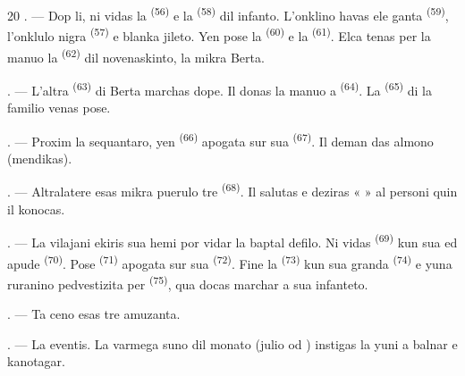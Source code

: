 \begin{VUpage}[22]{20}
. --- Dop li, ni vidas la  \textsuperscript{(56)} e la\nl
{} \textsuperscript{(58)} dil infanto. L'onklino havas ele\cc
ganta  \textsuperscript{(59)}, l'onklulo nigra  \textsuperscript{(57)}\nl
e blanka jileto. Yen pose la  \textsuperscript{(60)} e la\nl
{} \textsuperscript{(61)}. Elca tenas per la manuo la \cc
{} \textsuperscript{(62)} dil novenaskinto, la mikra Berta.

. --- L'altra  \textsuperscript{(63)} di Berta marchas\nl
dope. Il donas la manuo a  \textsuperscript{(64)}. La\nl
{} \textsuperscript{(65)} di la familio venas pose.

\VUsaut{4.6mm}
\VUsaut{3.4mm}

. --- Proxim la sequantaro, yen \cc
{} \textsuperscript{(66)} apogata sur sua  \textsuperscript{(67)}. Il deman\cc
das almono (mendikas).

. --- Altralatere esas mikra puerulo tre\nl
{} \textsuperscript{(68)}. Il salutas e deziras «  » al\nl
personi quin il konocas.

. --- La vilajani ekiris sua hemi por vidar\nl
la baptal defilo. Ni vidas  \textsuperscript{(69)} kun sua\nl
{} ed apude  \textsuperscript{(70)}. Pose \cc
{} \textsuperscript{(71)} apogata sur sua  \textsuperscript{(72)}. Fine la\nl
{} \textsuperscript{(73)} kun sua granda  \textsuperscript{(74)}\nl
e yuna ruranino pedvestizita per  \textsuperscript{(75)},\nl
qua docas marchar a sua infanteto.

. --- Ta ceno esas tre amuzanta.

\VUsaut{4.0mm}
\VUsaut{3.0mm}

\VUsaut{2.4mm}

\VUsaut{3.0mm}

. --- La  eventis. La varmega suno\nl
dil monato  (julio od ) instigas la\nl
yuni a balnar e kanotagar.
\end{VUpage}

